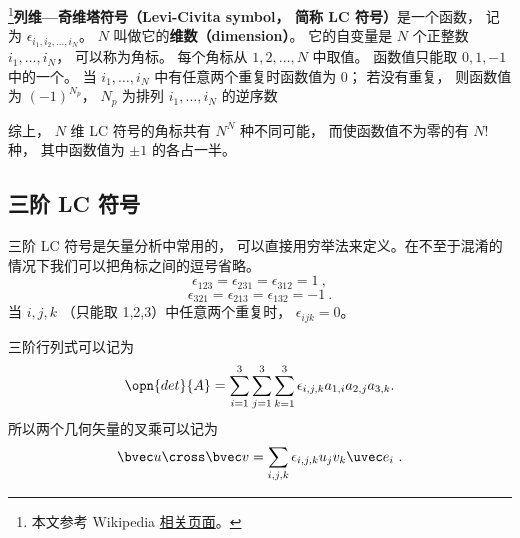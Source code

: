 

\footnote{本文参考 Wikipedia \href{https://en.wikipedia.org/wiki/Levi-Civita_symbol}{相关页面}。}\textbf{列维—奇维塔符号（Levi-Civita symbol， 简称 LC 符号）}是一个函数， 记为 $\epsilon_{i_1, i_2, \dots, i_N}$。 $N$ 叫做它的\textbf{维数（dimension）}。 它的自变量是 $N$ 个正整数 $i_1, \dots, i_N$， 可以称为角标。 每个角标从 $1, 2, \dots, N$ 中取值。 函数值只能取 $0, 1, -1$ 中的一个。 当 $i_1, \dots, i_N$ 中有任意两个重复时函数值为 0； 若没有重复， 则函数值为 $(-1)^{N_p}$， $N_p$ 为排列 $i_1, \dots, i_N$ 的逆序数

综上， $N$ 维 LC 符号的角标共有 $N^N$ 种不同可能， 而使函数值不为零的有 $N!$ 种， 其中函数值为 $\pm 1$ 的各占一半。

\subsection{三阶 LC 符号}
三阶 LC 符号是矢量分析中常用的， 可以直接用穷举法来定义。在不至于混淆的情况下我们可以把角标之间的逗号省略。
\begin{equation}
\epsilon_{123} = \epsilon_{231} = \epsilon_{312} = 1~,
\end{equation}
\begin{equation}
\epsilon_{321} = \epsilon_{213} = \epsilon_{132} = -1~.
\end{equation}
当 $i,j,k$ （只能取 1,2,3）中任意两个重复时， $\epsilon_{ijk} = 0$。

三阶行列式可以记为
\begin{equation}
\opn{det}{A} = \sum_{i = 1}^3 \sum_{j = 1}^3 \sum_{k = 1}^3 \epsilon_{i,j,k} a_{1,i} a_{2,j} a_{3,k}.
\end{equation}
所以两个几何矢量的叉乘可以记为
\begin{equation}
\bvec u \cross \bvec v = \sum_{i,j,k} \epsilon_{i,j,k} u_j v_k \uvec e_i~.
\end{equation}
